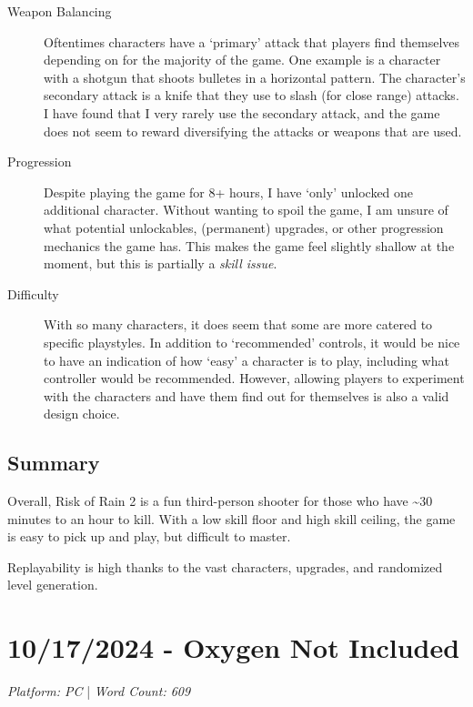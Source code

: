 \documentclass{article}
\begin{document}
\begin{description}
      \item[Weapon Balancing] Oftentimes characters have a `primary' attack that
            players find themselves depending on for the majority of the game. One
            example is a character with a shotgun that shoots bulletes in a horizontal
            pattern. The character's secondary attack is a knife that they use to slash
            (for close range) attacks. I have found that I very rarely use the secondary
            attack, and the game does not seem to reward diversifying the attacks or
            weapons that are used.
      \item[Progression] Despite playing the game for 8+ hours, I have
            `only' unlocked one additional character. Without wanting to spoil the
            game, I am unsure of what potential unlockables, (permanent) upgrades,
            or other progression mechanics the game has. This makes the game feel
            slightly shallow at the moment, but this is partially a \emph{skill issue}.
      \item[Difficulty] With so many characters, it does seem that some are more
            catered to specific playstyles. In addition to `recommended' controls, it
            would be nice to have an indication of how `easy' a character is to play,
            including what controller would be recommended.
            However, allowing players to experiment with the characters and have them
            find out for themselves is also a valid design choice.
\end{description}

\subsection{Summary}
Overall, Risk of Rain 2 is a fun third-person shooter for those who have
\textasciitilde 30 minutes to an hour to kill. With a low skill floor and high
skill ceiling, the game is easy to pick up and play, but difficult to master.

Replayability is high thanks to the vast characters, upgrades, and randomized
level generation.

\pagebreak

\section{10/17/2024 - Oxygen Not Included}

\begin{center}
      \textit{Platform: PC} | \textit{Word Count: 609}
\end{center}
\end{document}
